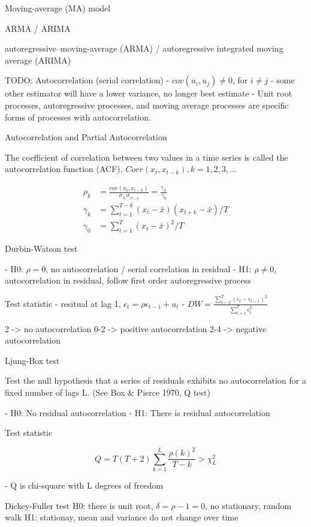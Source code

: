 \documentclass[11pt]{article}
\begin{document}
Moving-average (MA) model

ARMA / ARIMA

autoregressive–moving-average (ARMA) / autoregressive integrated moving average (ARIMA)

TODO: Autocorrelation (serial correlation)
- $cov(u_i,u_j) \neq 0$, for $i \neq j$ 
- some other estimator will have a lower variance, no longer best estimate
- Unit root processes, autoregressive processes, and moving average processes are specific forms of processes with autocorrelation.

Autocorrelation and Partial Autocorrelation

The coefficient of correlation between two values in a time series is called the autocorrelation function (ACF), $Corr(x_t, x_{t-k}), k=1,2,3,\dotsc$

$$
\begin{aligned}
\rho_k &= \frac{cov(x_t,x_{t-k})}{\sigma_{x_t} \sigma_{x_{t-k}}} = \frac{\gamma_k}{\gamma_0} \\
\gamma_k &= \sum^{T-k}_{t=1} (x_t-\bar{x})(x_{t+k}-\bar{x}) / T\\
\gamma_0 &= \sum^{T}_{t=1} (x_t-\bar{x})^2 / T
\end{aligned}
$$

Durbin-Watson test

- H0: $\rho = 0$, no autocorrelation / serial correlation in residual
- H1: $\rho \neq 0$, autocorrelation in residual, follow first order autoregressive process

Test statistic
- resitual at lag 1, $\epsilon_t = \rho \epsilon_{t-1} + u_t$
- $DW = \frac{\sum_{t=2}^{T} (\epsilon_t - \epsilon_{t-1})^2}{\sum_{t=1}^{T} \epsilon^2_t}$


2 -> no autocorrelation
0-2 -> positive autocorrelation
2-4 -> negative autocorrelation

Ljung-Box test 

Test the null hypothesis that a series of residuals exhibits no autocorrelation for a fixed number of lags L. (See Box \& Pierce 1970, Q test)

- H0: No residual autocorrelation
- H1: There is residual autocorrelation

Test statistic

$$
Q = T(T+2) \sum^L_{k=1} \frac{\rho(k)^2}{T-k} > \chi^2_L
$$

- Q is chi-square with L degrees of freedom

Dickey-Fuller test
H0: there is unit root, $\delta = \rho - 1 =0$, no stationary, random walk
H1: stationay, mean and variance do not change over time
\end{document}
